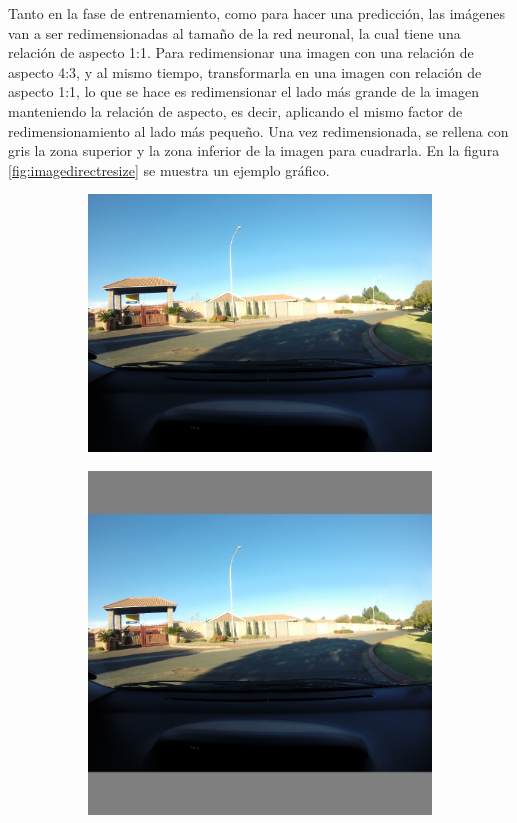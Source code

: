 Tanto en la fase de entrenamiento, como para hacer una predicción, las imágenes van a ser redimensionadas al tamaño de la red neuronal, la cual tiene una relación de aspecto 1:1. Para redimensionar una imagen con una relación de aspecto 4:3, y al mismo tiempo, transformarla en una imagen con relación de aspecto 1:1, lo que se hace es redimensionar el lado más grande de la imagen manteniendo la relación de aspecto, es decir, aplicando el mismo factor de redimensionamiento al lado más pequeño. Una vez redimensionada, se rellena con gris la zona superior y la zona inferior de la imagen para cuadrarla. En la figura \ref{fig:imagedirectresize} se muestra un ejemplo gráfico.

\begin{figure}[H]
	\centering
	\begin{subfigure}[h]{0.45\linewidth}
		\includegraphics[width=\linewidth]{images/image_direct_resize_before.jpg}
	\end{subfigure}
	\begin{subfigure}[h]{0.45\linewidth}
		\includegraphics[width=\linewidth]{images/image_direct_resize_after.jpg}

\end{subfigure}
\end{figure}
